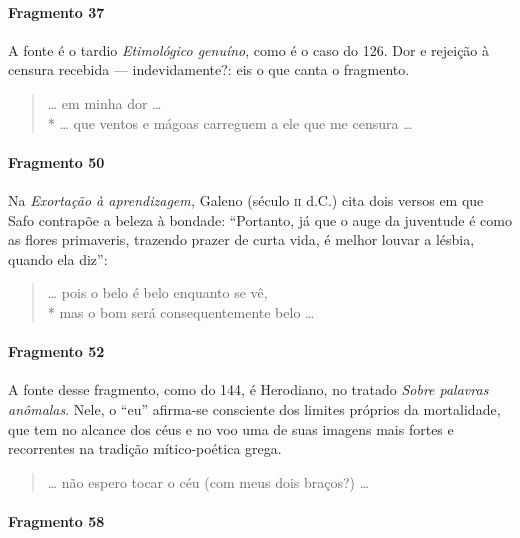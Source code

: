 {\paragraph{Fragmento 37}

{\small A fonte é o tardio \textit{Etimológico genuíno}, como é o caso do 126. Dor e
rejeição à censura recebida --- indevidamente?: eis o que canta o fragmento.}

\begin{verse}
\ldots{} em minha dor \ldots{}\\*
\ldots{} que ventos e mágoas carreguem a ele que me \qb{}censura \ldots{}
\end{verse}

\paragraph{Fragmento 50}

{\small Na \textit{Exortação à aprendizagem, }Galeno (século \textsc{ii} d.C.) cita dois versos
em que Safo contrapõe a beleza à bondade: ``Portanto, já que o auge da
juventude é como as flores primaveris, trazendo prazer de curta vida, é melhor
louvar a lésbia, quando ela diz'':}

\begin{verse}
\ldots{} pois o belo é belo enquanto se vê,\\*
mas o bom será consequentemente belo \ldots{}
\end{verse}

\paragraph{Fragmento 52}

{\small A fonte desse fragmento, como do 144, é Herodiano, no tratado \textit{Sobre
palavras anômalas}. Nele, o “eu” afirma-se consciente dos limites próprios da
mortalidade, que tem no alcance dos céus e no voo uma de suas imagens mais
fortes e recorrentes na tradição mítico-poética grega.}

\begin{verse}
\ldots{} não espero tocar o céu (com meus dois \qb{}braços?) \ldots{}
\end{verse}

\paragraph{Fragmento 58}

}
